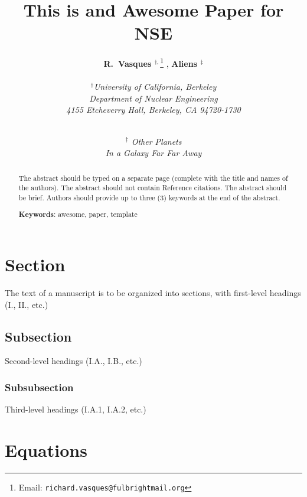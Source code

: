 \documentclass[12pt]{article}
\newcommand{\Keywords}[1]{\vspace{12pt}\par\noindent
{\small{\bf Keywords\/}: #1}}
\begin{document}
\title{This is and Awesome Paper for NSE }
\author{{\bf R.\ Vasques $^{\dagger,}$}\footnote{Email: \texttt{richard.vasques@fulbrightmail.org}} , {\bf Aliens $^\ddagger$}\\ \\
\em {\bf $^\dagger$}University of California, Berkeley\\
\em Department of Nuclear Engineering\\
\em 4155 Etcheverry Hall, Berkeley, CA 94720-1730\\
\and \\
\em {\bf $^\ddagger$} Other Planets \\
\em In a Galaxy Far Far Away}
\date{}
\maketitle

\begin{abstract}

The abstract should be typed on a separate page (complete with the title and names of the authors).  The abstract should not contain Reference citations. The abstract should be brief.
Authors should provide up to three (3) keywords at the end of the abstract.

\Keywords{awesome, paper, template}
\end{abstract}

\pagebreak

\doublespacing

\section{Section}

The text of a manuscript is to be organized into sections, with first-level headings (I., II., etc.) 

\subsection{Subsection}

Second-level headings (I.A., I.B., etc.)

\subsubsection{Subsubsection}

Third-level headings (I.A.1, I.A.2, etc.)

\section{Equations}
\end{document}
